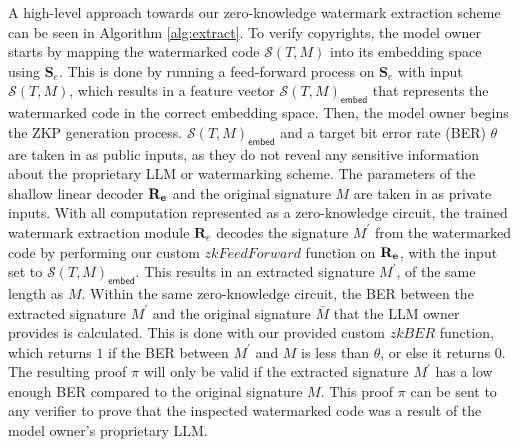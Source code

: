 A high-level approach towards our zero-knowledge watermark extraction scheme can be seen in Algorithm \ref{alg:extract}. To verify copyrights, the model owner starts by mapping the watermarked code $\mathcal{S}(T, M)$ into its embedding space using $\mathbf{S}_e$. This is done by running a feed-forward process on $\mathbf{S}_e$ with input $\mathcal{S}(T, M)$, which results in a feature vector $\mathcal{S}(T, M)_\textsf{embed}$ that represents the watermarked code in the correct embedding space. Then, the model owner begins the ZKP generation process. $\mathcal{S}(T, M)_\textsf{embed}$ and a target bit error rate (BER) $\theta$ are taken in as public inputs, as they do not reveal any sensitive information about the proprietary LLM or watermarking scheme. The parameters of the shallow linear decoder $\bf{R}_e$ and the original signature $M$ are taken in as private inputs. With all computation represented as a zero-knowledge circuit, the trained watermark extraction module $\mathbf{R}_e$ decodes the signature $M^\prime$ from the watermarked code by performing our custom $zkFeedForward$ function on $\bf{R}_e$, with the input set to $\mathcal{S}(T, M)_\textsf{embed}$. This results in an extracted signature $M^\prime$, of the same length as $M$. Within the same zero-knowledge circuit, the BER between the extracted signature $M^\prime$ and the original signature $\bar{M}$ that the LLM owner provides is calculated. This is done with our provided custom $zkBER$ function, which returns $1$ if the BER between $M^\prime$ and $M$ is less than $\theta$, or else it returns $0$. The resulting proof $\pi$ will only be valid if the extracted signature $M^\prime$ has a low enough BER compared to the original signature $M$. This proof $\pi$ can be sent to any verifier \Vrf to prove that the inspected watermarked code was a result of the model owner's proprietary LLM. 

